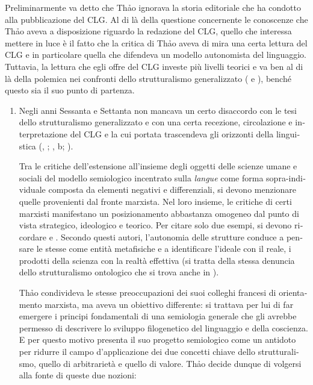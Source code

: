 \documentclass[output=paper]{langsci/langscibook}
\begin{document}
\begin{otherlanguage}{italian}
Preliminarmente va detto che Th\textlatin{ả}o ignorava la storia editoriale che ha condotto alla pubblicazione del CLG. Al di là della questione concernente le conoscenze che Th\textlatin{ả}o aveva a disposizione riguardo la redazione del CLG, quello che interessa mettere in luce è il fatto che la critica di Th\textlatin{ả}o aveva di mira una certa lettura del CLG e in particolare quella che difendeva un modello autonomista del linguaggio. Tuttavia, la lettura che egli offre del CLG investe più livelli teorici e va ben al di là della polemica nei confronti dello strutturalismo generalizzato (\citealt{chiss_structuralisme_2015} e \citealt{leon_historiographie_2013}), benché questo sia il suo punto di partenza.

\begin{enumerate}
\renewcommand{\labelenumi}{{\alph{enumi}})}

\item Negli anni Sessanta e Settanta non mancava un certo disaccordo con le tesi dello strutturalismo generalizzato e con una certa recezione, circolazione e interpretazione del CLG e la cui portata trascendeva gli orizzonti della linguistica (\citealt{dosse_histoire_1991}, \citeyear{dosse_histoire_1992}; \citealt{puech_lesprit_2013}, b; \citealt{lepschy_linguistica_1966}).

Tra le critiche dell’estensione all’insieme degli oggetti delle scienze umane e sociali del modello semiologico incentrato sulla \textit{langue} come forma sopra-individuale composta da elementi negativi e differenziali, si devono menzionare quelle provenienti dal fronte marxista. Nel loro insieme, le critiche di certi marxisti manifestano un posizionamento abbastanza omogeneo dal punto di vista strategico, ideologico e teorico. Per citare solo due esempi, si devono ricordare \citet{seve_structuralisme_1984} e \citet{lefebvre_au-a_1971}. Secondo questi autori, l’autonomia delle strutture conduce a pensare le stesse come entità metafisiche e a identificare l’ideale con il reale, i prodotti della scienza con la realtà effettiva (si tratta della stessa denuncia dello strutturalismo ontologico che si trova anche in \citealt{eco_struttura_1968}).

Th\textlatin{ả}o condivideva le stesse preoccupazioni dei suoi colleghi francesi di orientamento marxista, ma aveva un obiettivo differente: si trattava per lui di far emergere i principi fondamentali di una semiologia generale che gli avrebbe permesso di descrivere lo sviluppo filogenetico del linguaggio e della coscienza. E per questo motivo presenta il suo progetto semiologico come un antidoto per ridurre il campo d’applicazione dei due concetti chiave dello strutturalismo, quello di arbitrarietà e quello di valore. Th\textlatin{ả}o decide dunque di volgersi alla fonte di queste due nozioni:


\end{enumerate}
\end{otherlanguage}
\end{document}
